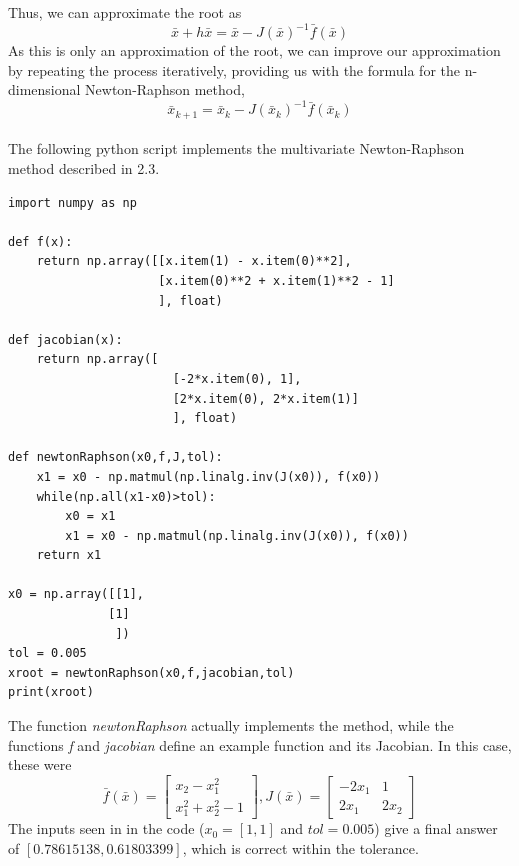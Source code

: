 \documentclass[10pt]{article}
\begin{document}
Thus, we can approximate the root as
\begin{equation}
\bar{x}+h\bar{x} = \bar{x}-J(\bar{x})^{-1}\bar{f}(\bar{x})
\end{equation}
As this is only an approximation of the root, we can improve our approximation by repeating the process iteratively, providing us with the formula for the n-dimensional Newton-Raphson method,
\begin{equation}
\bar{x}_{k+1} = \bar{x}_{k}-J(\bar{x}_{k})^{-1}\bar{f}(\bar{x}_{k})
\end{equation}
\\
The following python script implements the multivariate Newton-Raphson method described in 2.3.\\
\begin{lstlisting}
import numpy as np

def f(x):
    return np.array([[x.item(1) - x.item(0)**2],
                     [x.item(0)**2 + x.item(1)**2 - 1]
                     ], float)

def jacobian(x):
    return np.array([
                       [-2*x.item(0), 1],
                       [2*x.item(0), 2*x.item(1)]
                       ], float)

def newtonRaphson(x0,f,J,tol):
    x1 = x0 - np.matmul(np.linalg.inv(J(x0)), f(x0))
    while(np.all(x1-x0)>tol):
        x0 = x1
        x1 = x0 - np.matmul(np.linalg.inv(J(x0)), f(x0))
    return x1

x0 = np.array([[1],
              [1]
               ])
tol = 0.005
xroot = newtonRaphson(x0,f,jacobian,tol)
print(xroot)
\end{lstlisting}
The function \textit{newtonRaphson} actually implements the method, while the functions \textit{f} and \textit{jacobian} define an example function and its Jacobian. In this case, these were
\begin{equation}
\bar{f}(\bar{x}) = \begin{bmatrix}
x_{2}-x_{1}^2\\
x_{1}^2 + x_{2}^2 - 1
\end{bmatrix}, J(\bar{x}) = \begin{bmatrix}
-2 x_{1} & 1\\
2 x_{1} & 2 x_{2}
\end{bmatrix}
\end{equation}
The inputs seen in in the code ($x_{0} = [1,1]$ and $tol = 0.005$) give a final answer of $[0.78615138,0.61803399]$, which is correct within the tolerance.
\\
\end{document}

